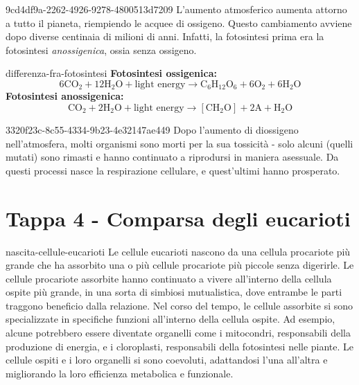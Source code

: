 \documentclass[preview]{standalone}
\begin{document}
\begin{snippet}{9cd4df9a-2262-4926-9278-4800513d7209}
    L'aumento atmosferico aumenta attorno a tutto il pianeta, riempiendo le acquee
    di ossigeno.
    Questo cambiamento avviene dopo diverse centinaia di milioni di anni.
    Infatti, la fotosintesi prima era la fotosintesi
    \textit{anossigenica}, ossia senza ossigeno.
\end{snippet}

\begin{snippet}{differenza-fra-fotosintesi}
    \textbf{Fotosintesi ossigenica:}
    \[ 6\text{CO}_2 + 12\text{H}_2\text{O} + \text{light energy} \longrightarrow \text{C}_6\text{H}_12\text{O}_6 + 6\text{O}_2 + 6\text{H}_2\text{O} \]
    \textbf{Fotosintesi anossigenica:}
    \[ \text{CO}_2 + 2\text{H}_2\text{O} + \text{light energy} \longrightarrow [\text{CH}_2\text{O}] + 2\text{A} + \text{H}_2\text{O} \]
\end{snippet}

\begin{snippet}{3320f23c-8c55-4334-9b23-4e32147ae449}
    Dopo l'aumento di diossigeno nell'atmosfera, molti organismi sono morti
    per la sua tossicità - solo alcuni (quelli mutati) sono rimasti e hanno continuato a riprodursi in
    maniera asessuale. Da questi processi nasce la respirazione cellulare, e
    quest'ultimi hanno prosperato.
\end{snippet}

\section{Tappa 4 - Comparsa degli eucarioti}

\begin{snippet}{nascita-cellule-eucarioti}
    Le cellule eucarioti nascono da una cellula procariote
    più grande che ha assorbito una o più cellule procariote più piccole senza digerirle.
    Le cellule procariote assorbite hanno continuato a vivere all'interno della cellula ospite più grande, in una sorta di simbiosi mutualistica, dove entrambe le parti traggono beneficio dalla relazione.
    Nel corso del tempo, le cellule assorbite si sono specializzate in specifiche funzioni all'interno della cellula ospite. Ad esempio, alcune potrebbero essere diventate organelli come i mitocondri, responsabili della produzione di energia, e i cloroplasti, responsabili della fotosintesi nelle piante.
    Le cellule ospiti e i loro organelli si sono coevoluti, adattandosi l'una all'altra e migliorando la loro efficienza metabolica e funzionale.
\end{snippet}
\end{document}
